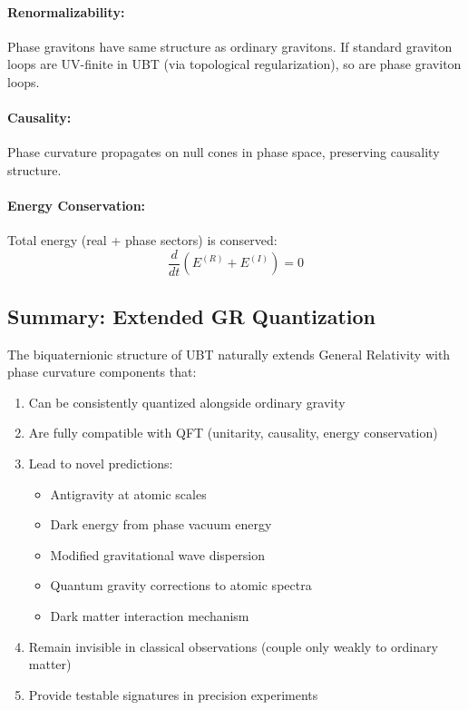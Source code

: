 \documentclass[12pt]{article}
\begin{document}
\paragraph{Renormalizability:} Phase gravitons have same structure as ordinary gravitons. If standard graviton loops are UV-finite in UBT (via topological regularization), so are phase graviton loops.

\paragraph{Causality:} Phase curvature propagates on null cones in phase space, preserving causality structure.

\paragraph{Energy Conservation:} Total energy (real + phase sectors) is conserved:
\begin{equation}
    \frac{d}{dt}(E^{(R)} + E^{(I)}) = 0
\end{equation}

\subsection{Summary: Extended GR Quantization}

The biquaternionic structure of UBT naturally extends General Relativity with phase curvature components that:

\begin{enumerate}
    \item Can be consistently quantized alongside ordinary gravity
    \item Are fully compatible with QFT (unitarity, causality, energy conservation)
    \item Lead to novel predictions:
    \begin{itemize}
        \item Antigravity at atomic scales
        \item Dark energy from phase vacuum energy
        \item Modified gravitational wave dispersion
        \item Quantum gravity corrections to atomic spectra
        \item Dark matter interaction mechanism
    \end{itemize}
    \item Remain invisible in classical observations (couple only weakly to ordinary matter)
    \item Provide testable signatures in precision experiments
\end{enumerate}
\end{document}
